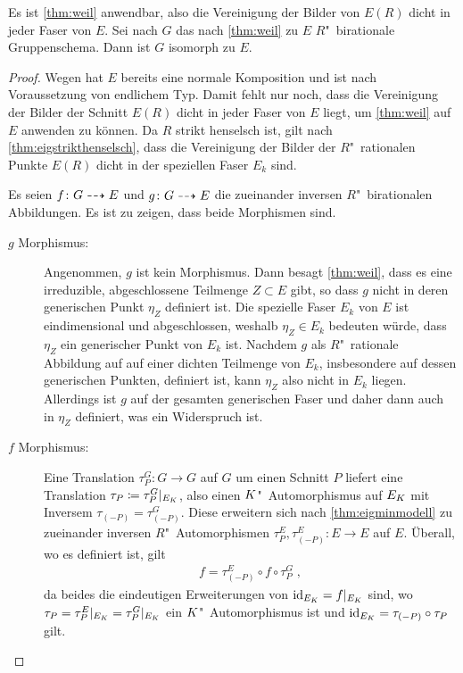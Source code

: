 \begin{Lemma}\label{thm:äqgruppenschema}
  Es ist \ref{thm:weil} anwendbar, also die Vereinigung der Bilder von
  $E(R)$ dicht in jeder Faser von $E$. Sei nach  $G$ das nach
  \ref{thm:weil} zu $E$ $R$"~birationale Gruppenschema. Dann ist $G$
  isomorph zu $E$.
  \begin{proof}
    Wegen \label{thm:egruppenschema} hat $E$ bereits eine normale
    Komposition und ist nach Voraussetzung von endlichem Typ. Damit
    fehlt nur noch, dass die Vereinigung der Bilder der Schnitt $E(R)$
    dicht in jeder Faser von $E$ liegt, um \ref{thm:weil} auf $E$
    anwenden zu können.
    Da $R$ strikt henselsch ist, gilt nach
    \ref{thm:eigstrikthenselsch}, dass die Vereinigung der Bilder der
    $R$"~rationalen Punkte $E(R)$ dicht in der speziellen Faser $E_k$
    sind.
    
    Es seien $f\colon G\dashrightarrow E$ und $g\colon G\dashrightarrow E$ die
    zueinander inversen $R$"~birationalen Abbildungen.
    Es ist zu zeigen, dass beide Morphismen sind.
    \begin{description}
    \item[$g$ Morphismus:] Angenommen, $g$ ist kein
      Morphismus. Dann besagt \ref{thm:weil}, dass es eine
      irreduzible, abgeschlossene Teilmenge $Z\subset E$ gibt, so
      dass $g$ nicht in deren generischen Punkt $\eta_Z$ definiert
      ist. Die spezielle Faser $E_k$ von $E$ ist eindimensional und
      abgeschlossen, weshalb $\eta_Z\in E_k$ bedeuten würde, dass
      $\eta_Z$ ein generischer Punkt von $E_k$ ist.
      Nachdem $g$ als $R$"~rationale Abbildung auf auf einer
      dichten Teilmenge von $E_k$, insbesondere auf dessen
      generischen Punkten, definiert ist, kann $\eta_Z$ also nicht in
      $E_k$ liegen.
      Allerdings ist $g$ auf der gesamten generischen Faser und daher
      dann auch in $\eta_Z$ definiert, was ein Widerspruch ist.
    \item[$f$ Morphismus:] Eine Translation $\tau_P^G\colon G\to G$
      auf $G$ um einen Schnitt $P$ liefert eine Translation
      $\tau_P\coloneqq\tau_P^G|_{E_{K}}$, also einen
      $K$"~Automorphismus auf $E_{K}$ mit Inversem
      $\tau_{(-P)}=\tau_{(-P)}^G$. Diese 
      erweitern sich nach \ref{thm:eigminmodell} zu zueinander
      inversen $R$"~Automorphismen
      $\tau_P^E,\tau_{(-P)}^E\colon E\to E$ auf $E$.
      Überall, wo es definiert ist, gilt
      \begin{gather*}
        f = \tau_{(-P)}^E\circ f\circ \tau_P^G\;,
      \end{gather*}
      da beides die eindeutigen Erweiterungen von
      $\mathrm{id}_{E_{K}}=f|_{E_{K}}$ sind, wo
      ${\tau_P=\tau_P^E|_{E_{K}}=\tau_P^G|_{E_{K}}}$ ein
      $K$"~Automorphismus ist und ${\mathrm{id}_{E_{K}}=\tau_{(-P)}\circ\tau_P}$
      gilt.
      

\end{description}
\end{proof}
\end{Lemma}
